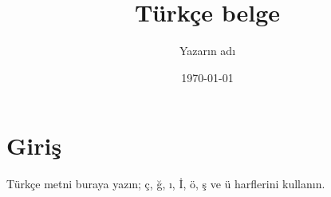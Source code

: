 \documentclass[11pt,a4paper]{article}
\title{Türkçe belge}
\author{Yazarın adı}
\date{\today}
\begin{document}
\maketitle
\section{Giriş}
Türkçe metni buraya yazın; ç, ğ, ı, İ, ö, ş ve ü harflerini kullanın.
\end{document}

